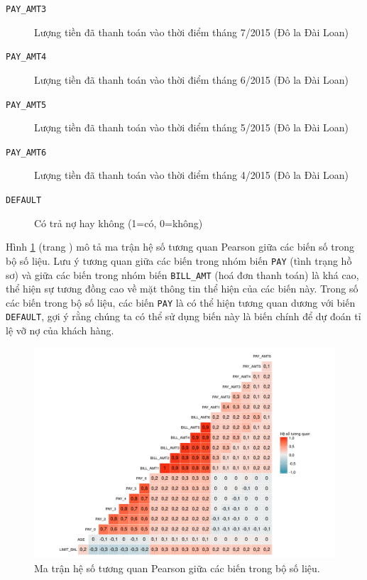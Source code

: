\documentclass[a4paper]{report}\usepackage[]{graphicx}\usepackage[]{color}
\newenvironment{knitrout}{}{} %
\begin{document}
\begin{description}
  \item [\texttt{PAY\_AMT3}] Lượng tiền đã thanh toán vào thời điểm tháng 7/2015 (Đô la Đài Loan)
  \item [\texttt{PAY\_AMT4}] Lượng tiền đã thanh toán vào thời điểm tháng 6/2015 (Đô la Đài Loan)
  \item [\texttt{PAY\_AMT5}] Lượng tiền đã thanh toán vào thời điểm tháng 5/2015 (Đô la Đài Loan)
  \item [\texttt{PAY\_AMT6}] Lượng tiền đã thanh toán vào thời điểm tháng 4/2015 (Đô la Đài Loan)
  \item [\texttt{DEFAULT}] Có trả nợ hay không (1=có, 0=không)
\end{description}


Hình \ref{fig:corr_mat} (trang \pageref{fig:corr_mat}) mô tả ma trận hệ số tương quan Pearson giữa các biến số trong bộ số liệu. 
Lưu ý tương quan giữa các biến trong nhóm biến \texttt{PAY} (tình trạng hồ sơ) và 
giữa các biến trong nhóm biến \texttt{BILL\_AMT} (hoá đơn thanh toán) là khá cao, thể hiện sự tương đồng cao về mặt thông tin thể hiện của các biến này.
Trong số các biến trong bộ số liệu, các biến \texttt{PAY} là có thể hiện tương quan dương với biến \texttt{DEFAULT}, gợi ý rằng chúng ta có thể sử dụng biến này là biến chính để dự đoán tỉ lệ vỡ nợ của khách hàng.

\begin{figure}[h]
\centering
\capstart
\begin{knitrout}\small
{}\color{fgcolor}
\includegraphics[width=\textwidth]{Figures/corr_mat-1} 

\end{knitrout}
\caption[Ma trận hệ số tương quan Pearson]{Ma trận hệ số tương quan Pearson giữa các biến trong bộ số liệu.}
\label{fig:corr_mat}
\end{figure}
\end{document}
